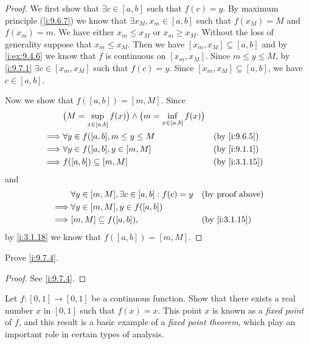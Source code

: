 \begin{proof}
  We first show that \(\exists c \in [a, b]\) such that \(f(c) = y\).
  By maximum principle (\cref{i:9.6.7}) we know that \(\exists x_M, x_m \in [a, b]\) such that \(f(x_M) = M\) and \(f(x_m) = m\).
  We have either \(x_m \leq x_M\) or \(x_m \geq x_M\).
  Without the loss of generality suppose that \(x_m \leq x_M\).
  Then we have \([x_m, x_M] \subseteq [a, b]\) and by \cref{i:ex:9.4.6} we know that \(f\) is continuous on \([x_m, x_M]\).
  Since \(m \leq y \leq M\), by \cref{i:9.7.1} \(\exists c \in [x_m, x_M]\) such that \(f(c) = y\).
  Since \([x_m, x_M] \subseteq [a, b]\), we have \(c \in [a, b]\).

  Now we show that \(f([a, b]) = [m, M]\).
  Since
  \begin{align*}
             & \big(M = \sup_{x \in [a, b]} f(x)\big) \land \big(m = \inf_{x \in [a, b]} f(x)\big)                    \\
    \implies & \forall y \in f([a, b], m \leq y \leq M                                             &  & \by{i:9.6.5}  \\
    \implies & \forall y \in f([a, b], y \in [m, M]                                                &  & \by{i:9.1.1}  \\
    \implies & f([a, b]) \subseteq [m, M]                                                          &  & \by{i:3.1.15}
  \end{align*}
  and
  \begin{align*}
             & \forall y \in [m, M], \exists c \in [a, b] : f(c) = y &  & \text{(by proof above)} \\
    \implies & \forall y \in [m, M], y \in f([a, b])                                              \\
    \implies & [m, M] \subseteq f([a, b]),                           &  & \by{i:3.1.15}
  \end{align*}
  by \cref{i:3.1.18} we know that \(f([a, b]) = [m ,M]\).
\end{proof}

\exercisesection

\begin{ex}\label{i:ex:9.7.1}
  Prove \cref{i:9.7.4}.
\end{ex}

\begin{proof}
  See \cref{i:9.7.4}.
\end{proof}

\begin{ex}\label{i:ex:9.7.2}
  Let \(f : [0, 1] \to [0, 1]\) be a continuous function.
  Show that there exists a real number \(x\) in \([0, 1]\) such that \(f(x) = x\).
  This point \(x\) is known as a \emph{fixed point} of \(f\), and this result is a basic example of a \emph{fixed point theorem}, which play an important role in certain types of analysis.
\end{ex}

